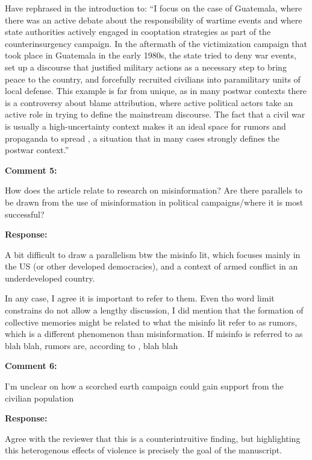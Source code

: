 \documentclass[12pt, a4paper, notitlepage]{article}
\begin{document}
Have rephrased in the introduction to:
``I focus on the case of Guatemala, where there was an active debate about the responsibility of wartime events and where state authorities actively engaged in cooptation strategies as part of the counterinsurgency campaign.
In the aftermath of the victimization campaign that took place in Guatemala in the early 1980s, the state tried to deny war events, set up a discourse that justified military actions as a necessary step to bring peace to the country, and forcefully recruited civilians into paramilitary units of local defense.
This example is far from unique, as in many postwar contexts there is a controversy about blame attribution, where active political actors take an active role in trying to define the mainstream discourse.
The fact that a civil war is usually a high-uncertainty context makes it an ideal space for rumors and propaganda to spread \citep{Schon:2021wf}, a situation that in many cases strongly defines the postwar context.''

\vspace{15pt}
\noindent\textbf{Comment 5:}
\begin{displayquote}
How does the article relate to research on misinformation? Are there parallels to be drawn from the use of misinformation in political campaigns/where it is most successful?
\end{displayquote}

\noindent\textbf{Response:}

A bit difficult to draw a parallelism btw the misinfo lit, which focuses mainly in the US (or other developed democracies), and a context of armed conflict in an underdeveloped country.

In any case, I agree it is important to refer to them. Even tho word limit constrains do not allow a lengthy discussion, I did mention that the formation of collective memories might be related to what the misinfo lit refer to as rumors, which is a different phenomenon than misinformation. If misinfo is referred to as blah blah, rumors are, according to \citet{Berinsky:2017ty}, blah blah


\vspace{15pt}
\noindent\textbf{Comment 6:}
\begin{displayquote}
I'm unclear on how a scorched earth campaign could gain support from the civilian population
\end{displayquote}

\noindent\textbf{Response:}

Agree with the reviewer that this is a counterintruitive finding, but highlighting this heterogenous effects of violence is precisely the goal of the manuscript.
\end{document}
